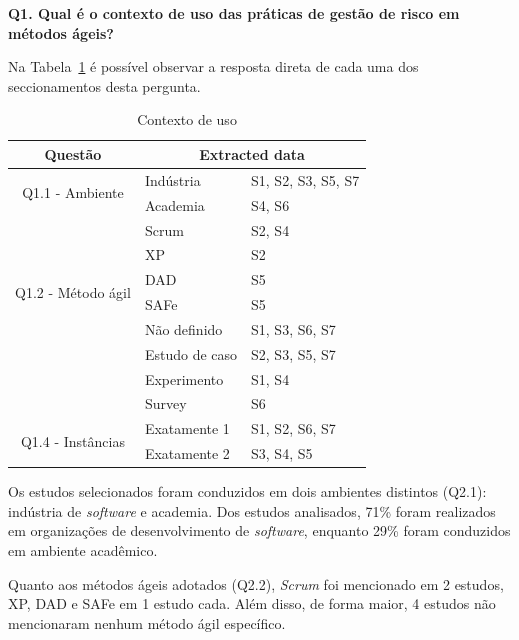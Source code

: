 \documentclass[
	12pt,
	openright,
	twoside,
	a4paper,
	english,
	brazil
	]{abntex2}
\begin{document}
\textbf{Q1. Qual é o contexto de uso das práticas de gestão de risco em métodos ágeis?}

Na Tabela~\ref{contexto} é possível observar a resposta direta de cada uma dos seccionamentos desta pergunta.

\begin{table}[h!]
  \centering
  \caption{Contexto de uso}
  \begin{tabular}{|c|l|l|}
  \hline
  \textbf{Questão} & \multicolumn{2}{c|}{\textbf{Extracted data}} \\ \hline
  \multirow{2}{*}{Q1.1 - Ambiente} & Indústria & S1, S2, S3, S5, S7 \\ \cline{2-3}
                                  & Academia  & S4, S6 \\ \hline
  \multirow{6}{*}{Q1.2 - Método ágil} & Scrum   & S2, S4 \\ \cline{2-3}
                                     & XP      & S2 \\ \cline{2-3}
                                     & DAD     & S5 \\ \cline{2-3}
                                     & SAFe    & S5 \\ \cline{2-3}
                                     & Não definido & S1, S3, S6, S7 \\ \hline
  \multirow{3}{*}{Q1.3 - Tipo}        & Estudo de caso & S2, S3, S5, S7 \\ \cline{2-3}
                                     & Experimento    & S1, S4 \\ \cline{2-3}
                                     & Survey         & S6 \\ \hline
  \multirow{2}{*}{Q1.4 - Instâncias}  & Exatamente 1   & S1, S2, S6, S7 \\ \cline{2-3}
                                     & Exatamente 2   & S3, S4, S5 \\ \hline
  \end{tabular}
  \label{contexto}
  \end{table}

Os estudos selecionados foram conduzidos em dois ambientes distintos (Q2.1): indústria de \textit{software} e academia. Dos estudos analisados, 71\% foram realizados em organizações de desenvolvimento de \textit{software}, enquanto 29\% foram conduzidos em ambiente acadêmico.

Quanto aos métodos ágeis adotados (Q2.2), \textit{Scrum} foi mencionado em 2 estudos, XP, DAD e SAFe em 1 estudo cada. Além disso, de forma maior, 4 estudos não mencionaram nenhum método ágil específico.
\end{document}
